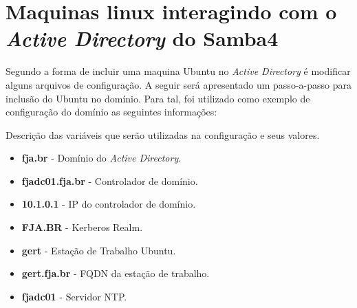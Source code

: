 




\section{Maquinas linux interagindo com o \textit{Active Directory} do  Samba4}

Segundo \cite{UBUNTU-WIKI} a forma de incluir uma maquina Ubuntu no \textit{Active Directory} é modificar alguns arquivos de configuração. A seguir será apresentado um passo-a-passo para inclusão do Ubuntu no domínio. Para tal, foi utilizado como exemplo de configuração do domínio as seguintes informações:

Descrição das variáveis que serão utilizadas na configuração e seus valores.

\begin{itemize}
	\item \textbf{fja.br} -  Domínio do \textit{Active Directory}.
	\item \textbf{fjadc01.fja.br} - Controlador de domínio.
	\item \textbf{10.1.0.1} - IP do controlador de domínio.
	\item \textbf{FJA.BR} - Kerberos Realm.
	\item \textbf{gert} - Estação de Trabalho Ubuntu.
	\item \textbf{gert.fja.br} - FQDN da estação de trabalho.
	\item \textbf{fjadc01} - Servidor NTP.
\end{itemize}

